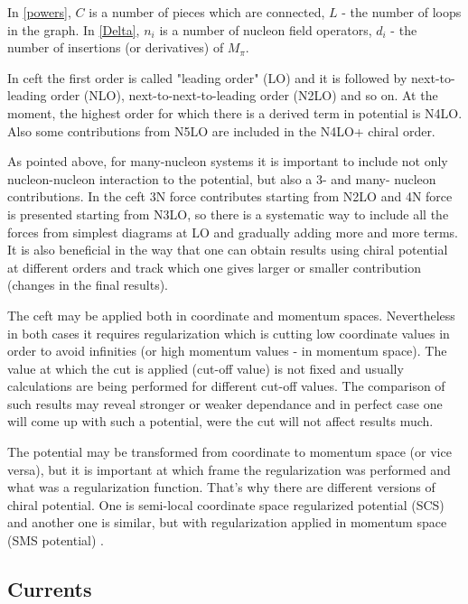 In \ref*{powers}, $C$ is a number of pieces which are connected, $L$ - the number of loops in the graph.
In \ref*{Delta}, $n_i$ is a number of nucleon field operators, $d_i$ - the number of insertions
(or derivatives) of  $M_\pi$.

In \gls*{ceft} the first order is called "leading order" (LO)  and it is followed 
by next-to-leading order (NLO), next-to-next-to-leading order (N2LO) and so on.
At the moment, the highest order for which there is a derived term in potential
is N4LO. Also some contributions from N5LO are included in the N4LO+ chiral order. 


As pointed above, for many-nucleon systems it is important to include not 
only nucleon-nucleon interaction to the potential, but also a 3- and many- nucleon
contributions. In the \gls*{ceft} 3N force contributes starting from N2LO and
4N force is presented starting from N3LO, so there is a systematic
way to include all the forces from simplest diagrams at LO and gradually
adding more and more terms. It is also beneficial in the way that 
one can obtain results using chiral potential at different
orders and track which one gives larger or smaller contribution (changes in the
final results).

The \gls*{ceft} may be applied both in coordinate and momentum spaces.
Nevertheless in both cases it requires regularization which is cutting 
low coordinate values in order to avoid infinities 
(or high momentum values - in momentum space). The value at which
the cut is applied (cut-off value) is not fixed and usually calculations
are being performed for different cut-off values. The comparison
of such results may reveal stronger or weaker dependance and in perfect
case one will come up with such a potential, were the cut will
not affect results much.

The potential may be transformed from coordinate to momentum space (or vice versa),
but it is important at which frame the regularization was performed
and what was a regularization function. That's why there are different 
versions of chiral potential. One is semi-local coordinate space regularized potential (SCS) \cite{Epelbaum2014SCS}
and another one is similar, but with regularization applied in momentum space (SMS potential) \cite{reinkrebs2018}.


\subsection*{Currents}
 
